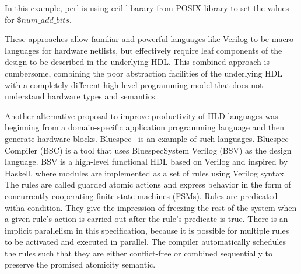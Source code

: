 In this example, perl is using ceil libarary from POSIX library to set the values for $\$num\_add\_bits$.

These approaches allow familiar and powerful languages like Verilog to be macro languages for hardware netlists, but effectively require leaf components of the design to be described in the underlying HDL.
This combined approach is cumbersome, combining the poor abstraction facilities of the underlying HDL with a completely different high-level programming model that does not understand hardware types and semantics.

Another alternative proposal to improve productivity of HLD languages was beginning from a domain-specific application programming language and then generate hardware blocks. 
Bluespec~\cite{bluespec} is an example of such languages.
Bluespec Compiler (BSC) is a tool that uses BluespecSystem  Verilog  (BSV)  as  the  design  language.
BSV is a high-level functional HDL based on Verilog and inspired by Haskell, where  modules are implemented as a set of rules using  Verilog  syntax.
The rules are called guarded atomic actions and express behavior in the form of concurrently cooperating finite state machines (FSMs).
Rules are predicated witha condition. They give the impression of freezing the rest of the system when a given rule's action is carried out after the rule's predicate is true.
There is an implicit parallelism in this specification, because it is possible for multiple rules to be activated and executed in parallel.
The compiler automatically schedules the rules such that they are either conflict-free or combined sequentially to preserve the promised atomicity semantic.




